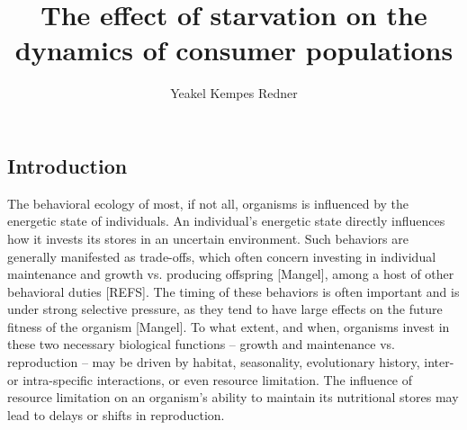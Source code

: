 \documentclass[12pt,english]{article}
\begin{document}
\begin{spacing}{1.9}


\title{The effect of starvation on the dynamics of consumer populations}
\author{Yeakel Kempes Redner}
\maketitle

\linenumbers

\section{Introduction}

The behavioral ecology of most, if not all, organisms is influenced by the energetic state of individuals.
An individual's energetic state directly influences how it invests its stores in an uncertain environment.
Such behaviors are generally manifested as trade-offs, which often concern investing in individual maintenance and growth vs. producing offspring [Mangel], among a host of other behavioral duties [REFS].
The timing of these behaviors is often important and is under strong selective pressure, as they tend to have large effects on the future fitness of the organism [Mangel].
To what extent, and when, organisms invest in these two necessary biological functions -- growth and maintenance vs. reproduction -- may be driven by habitat, seasonality, evolutionary history, inter- or intra-specific interactions, or even resource limitation.
The influence of resource limitation on an organism's ability to maintain its nutritional stores may lead to delays or shifts in reproduction. %


\end{spacing}
\end{document}
